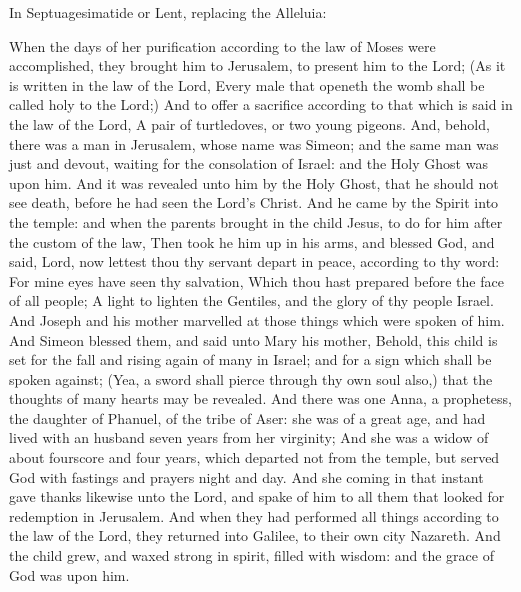 
\begin{rubric}
{In Septuagesimatide or Lent, replacing the Alleluia:}
\end{rubric}\par\noindent


 When the days of her purification according to the law of Moses were accomplished, they brought him to Jerusalem, to present him to the Lord; (As it is written in the law of the Lord, Every male that openeth the womb shall be called holy to the Lord;) And to offer a sacrifice according to that which is said in the law of the Lord, A pair of turtledoves, or two young pigeons. And, behold, there was a man in Jerusalem, whose name was Simeon; and the same man was just and devout, waiting for the consolation of Israel: and the Holy Ghost was upon him. And it was revealed unto him by the Holy Ghost, that he should not see death, before he had seen the Lord's Christ. And he came by the Spirit into the temple: and when the parents brought in the child Jesus, to do for him after the custom of the law, Then took he him up in his arms, and blessed God, and said, Lord, now lettest thou thy servant depart in peace, according to thy word: For mine eyes have seen thy salvation, Which thou hast prepared before the face of all people; A light to lighten the Gentiles, and the glory of thy people Israel. And Joseph and his mother marvelled at those things which were spoken of him. And Simeon blessed them, and said unto Mary his mother, Behold, this child is set for the fall and rising again of many in Israel; and for a sign which shall be spoken against; (Yea, a sword shall pierce through thy own soul also,) that the thoughts of many hearts may be revealed. And there was one Anna, a prophetess, the daughter of Phanuel, of the tribe of Aser: she was of a great age, and had lived with an husband seven years from her virginity; And she was a widow of about fourscore and four years, which departed not from the temple, but served God with fastings and prayers night and day. And she coming in that instant gave thanks likewise unto the Lord, and spake of him to all them that looked for redemption in Jerusalem. And when they had performed all things according to the law of the Lord, they returned into Galilee, to their own city Nazareth. And the child grew, and waxed strong in spirit, filled with wisdom: and the grace of God was upon him.

